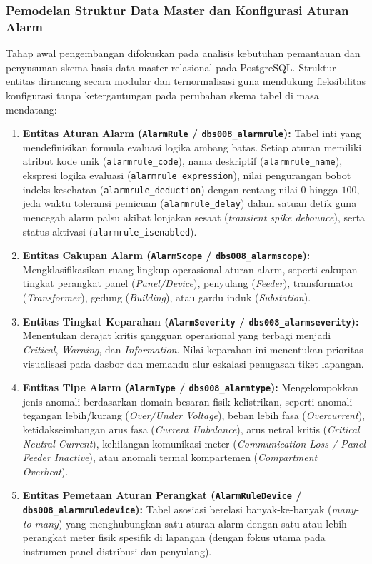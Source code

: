 \subsubsection{Pemodelan Struktur Data Master dan Konfigurasi Aturan Alarm}

Tahap awal pengembangan difokuskan pada analisis kebutuhan pemantauan dan penyusunan skema basis data master relasional pada PostgreSQL. Struktur entitas dirancang secara modular dan ternormalisasi guna mendukung fleksibilitas konfigurasi tanpa ketergantungan pada perubahan skema tabel di masa mendatang:

\begin{enumerate}[label=\arabic*., leftmargin=*, itemsep=0pt]
  \item \textbf{Entitas Aturan Alarm (\texttt{AlarmRule} / \texttt{dbs008\_alarmrule}):} Tabel inti yang mendefinisikan formula evaluasi logika ambang batas. Setiap aturan memiliki atribut kode unik (\texttt{alarmrule\_code}), nama deskriptif (\texttt{alarmrule\_name}), ekspresi logika evaluasi (\texttt{alarmrule\_expression}), nilai pengurangan bobot indeks kesehatan (\texttt{alarmrule\_deduction}) dengan rentang nilai $0$ hingga $100$, jeda waktu toleransi pemicuan (\texttt{alarmrule\_delay}) dalam satuan detik guna mencegah alarm palsu akibat lonjakan sesaat (\textit{transient spike debounce}), serta status aktivasi (\texttt{alarmrule\_isenabled}).
  \item \textbf{Entitas Cakupan Alarm (\texttt{AlarmScope} / \texttt{dbs008\_alarmscope}):} Mengklasifikasikan ruang lingkup operasional aturan alarm, seperti cakupan tingkat perangkat panel (\textit{Panel/Device}), penyulang (\textit{Feeder}), transformator (\textit{Transformer}), gedung (\textit{Building}), atau gardu induk (\textit{Substation}).
  \item \textbf{Entitas Tingkat Keparahan (\texttt{AlarmSeverity} / \texttt{dbs008\_alarmseverity}):} Menentukan derajat kritis gangguan operasional yang terbagi menjadi \textit{Critical}, \textit{Warning}, dan \textit{Information}. Nilai keparahan ini menentukan prioritas visualisasi pada dasbor dan memandu alur eskalasi penugasan tiket lapangan.
  \item \textbf{Entitas Tipe Alarm (\texttt{AlarmType} / \texttt{dbs008\_alarmtype}):} Mengelompokkan jenis anomali berdasarkan domain besaran fisik kelistrikan, seperti anomali tegangan lebih/kurang (\textit{Over/Under Voltage}), beban lebih fasa (\textit{Overcurrent}), ketidakseimbangan arus fasa (\textit{Current Unbalance}), arus netral kritis (\textit{Critical Neutral Current}), kehilangan komunikasi meter (\textit{Communication Loss / Panel Feeder Inactive}), atau anomali termal kompartemen (\textit{Compartment Overheat}).
  \item \textbf{Entitas Pemetaan Aturan Perangkat (\texttt{AlarmRuleDevice} / \texttt{dbs008\_alarmruledevice}):} Tabel asosiasi berelasi banyak-ke-banyak (\textit{many-to-many}) yang menghubungkan satu aturan alarm dengan satu atau lebih perangkat meter fisik spesifik di lapangan (dengan fokus utama pada instrumen panel distribusi dan penyulang).
\end{enumerate}

